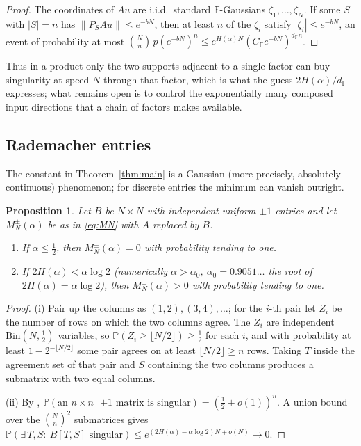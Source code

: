 \documentclass[11pt,reqno]{amsart}
\theoremstyle{plain}
\newtheorem{proposition}[theorem]{Proposition}
\theoremstyle{definition}
\theoremstyle{remark}
\newcommand{\F}{\mathbb{F}}
\newcommand{\PP}{\mathbb{P}}
\newcommand{\dF}{d_{\F}}
\begin{document}
\begin{proof}
The coordinates of $Au$ are i.i.d.\ standard $\F$-Gaussians $\zeta_1,\dots,\zeta_N$. If some $S$
with $|S|=n$ has $\|P_SAu\|\le e^{-bN}$, then at least $n$ of the $\zeta_i$ satisfy
$|\zeta_i|\le e^{-bN}$, an event of probability at most
$\binom Nn\,p(e^{-bN})^{n}\le e^{H(\alpha)N}(C_\F e^{-bN})^{\dF n}$.
\end{proof}

Thus in a product only the two supports adjacent to a single factor can buy singularity at speed
$N$ through that factor, which is what the guess $2H(\alpha)/\dF$ expresses; what remains open is
to control the exponentially many composed input directions that a chain of factors makes
available.

\subsection{Rademacher entries}
The constant in Theorem~\ref{thm:main} is a Gaussian (more precisely, absolutely continuous)
phenomenon; for discrete entries the minimum can vanish outright.

\begin{proposition}\label{prop:rademacher}
Let $B$ be $N\times N$ with independent uniform $\pm1$ entries and let $M_N^{\pm}(\alpha)$ be as in
\eqref{eq:MN} with $A$ replaced by $B$.
\begin{enumerate}
\item If $\alpha\le\tfrac12$, then $M_N^{\pm}(\alpha)=0$ with probability tending to one.
\item If $2H(\alpha)<\alpha\log2$ (numerically $\alpha>\alpha_0$, $\alpha_0=0.9051\ldots$ the root
  of $2H(\alpha)=\alpha\log2$), then $M_N^{\pm}(\alpha)>0$ with probability tending to one.
\end{enumerate}
\end{proposition}

\begin{proof}
(i) Pair up the columns as $(1,2),(3,4),\dots$; for the $i$-th pair let $Z_i$ be the number of rows
on which the two columns agree. The $Z_i$ are independent $\mathrm{Bin}(N,\tfrac12)$ variables, so
$\PP(Z_i\ge\lfloor N/2\rfloor)\ge\tfrac12$ for each $i$, and with probability at least
$1-2^{-\lfloor N/2\rfloor}$ some pair agrees on at least $\lfloor N/2\rfloor\ge n$ rows. Taking $T$
inside the agreement set of that pair and $S$ containing the two columns produces a submatrix with
two equal columns.

(ii) By \cite{tikhomirov}, $\PP(\text{an $n\times n$ $\pm1$ matrix is singular})=(\tfrac12+o(1))^n$.
A union bound over the $\binom Nn^2$ submatrices gives
$\PP(\exists\,T,S:\ B[T,S]\text{ singular})\le e^{(2H(\alpha)-\alpha\log2)N+o(N)}\to0$.
\end{proof}
\end{document}
